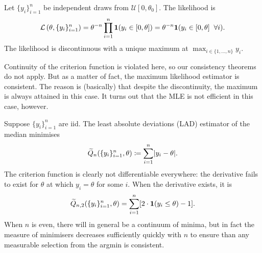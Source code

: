 \documentclass[11pt,letterpaper,reqno,oneside]{article}
\begin{document}
\begin{example}
	Let $\{ y_i \}_{i=1}^n$ be independent draws from $\mathcal{U}[0,\theta_0]$. The likelihood is
	\begin{equation*}
		\mathcal{L}\left( \theta, \{ y_i \}_{i=1}^n \right) 
		= \theta^{-n} \prod_{i=1}^n \boldsymbol{1}( y_i \in [0,\theta] )
		= \theta^{-n} \boldsymbol{1}( y_i \in [0,\theta] \;\; \forall i ) .
	\end{equation*}
	The likelihood is discontinuous with a unique maximum at $\max_{i\in\{1,\dots,n\}} y_i$.

	Continuity of the criterion function is violated here, so our consistency theorems do not apply. But as a matter of fact, the maximum likelihood estimator is consistent. The reason is (basically) that despite the discontinuity, the maximum is always attained in this case. It turns out that the MLE is not efficient in this case, however.
\end{example}

\begin{example}
	Suppose $\{ y_i \}_{i=1}^n$ are iid. The least absolute deviations (LAD) estimator of the median minimises
	\begin{equation*}
		\widetilde{Q}_n(\{y_i\}_{i=1}^n,\theta) \coloneqq \sum_{i=1}^n \lvert y_i - \theta \rvert .
	\end{equation*}
	The criterion function is clearly not differentiable everywhere: the derivative fails to exist for $\theta$ at which $y_i = \theta$ for some $i$. When the derivative exists, it is
	\begin{equation*}
		\widetilde{Q}_{n,2}(\{y_i\}_{i=1}^n,\theta) 
		= \sum_{i=1}^n [ 2 \cdot \boldsymbol{1}( y_i \leq \theta ) - 1 ] .
	\end{equation*}
	When $n$ is even, there will in general be a continuum of minima, but in fact the measure of minimisers decreases sufficiently quickly with $n$ to ensure than any measurable selection from the argmin is consistent.
\end{example}
\end{document}
